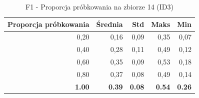 \begin{table}[htbp]
\centering
\small
\setlength{\tabcolsep}{6pt}
\renewcommand{\arraystretch}{1.2}
\caption{F1 - Proporcja próbkowania na zbiorze 14 (ID3)}
\label{tab:ID3_sample_ratio_14_f1}
\begin{tabular}{r|r|r|r|r}
\toprule
Proporcja próbkowania & Średnia & Std & Maks & Min \\
\hline
0,20 & 0,16 & 0,09 & 0,35 & 0,07 \\
0,40 & 0,28 & 0,11 & 0,49 & 0,12 \\
0,60 & 0,35 & 0,09 & 0,53 & 0,18 \\
0,80 & 0,37 & 0,08 & 0,49 & 0,14 \\
\textbf{1.00} & \textbf{0.39} & \textbf{0.08} & \textbf{0.54} & \textbf{0.26} \\
\bottomrule
\end{tabular}
\end{table}